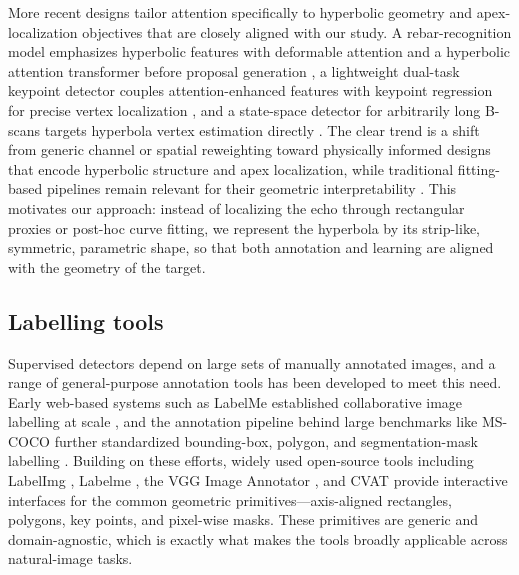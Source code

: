 \documentclass[lettersize,journal]{IEEEtran}
\begin{document}
More recent designs tailor attention specifically to hyperbolic geometry and apex-localization objectives that are closely aligned with our study. A rebar-recognition model emphasizes hyperbolic features with deformable attention and a hyperbolic attention transformer before proposal generation \cite{li2025rebar}, a lightweight dual-task keypoint detector couples attention-enhanced features with keypoint regression for precise vertex localization \cite{hou2025endtoend}, and a state-space detector for arbitrarily long B-scans targets hyperbola vertex estimation directly \cite{lan2024statespace}. The clear trend is a shift from generic channel or spatial reweighting toward physically informed designs that encode hyperbolic structure and apex localization, while traditional fitting-based pipelines remain relevant for their geometric interpretability \cite{lei2019autohyperbola}. This motivates our approach: instead of localizing the echo through rectangular proxies or post-hoc curve fitting, we represent the hyperbola by its strip-like, symmetric, parametric shape, so that both annotation and learning are aligned with the geometry of the target.


\subsection{Labelling tools}
Supervised detectors depend on large sets of manually annotated images, and a range of general-purpose annotation tools has been developed to meet this need. Early web-based systems such as LabelMe established collaborative image labelling at scale \cite{russell2008labelme}, and the annotation pipeline behind large benchmarks like MS-COCO further standardized bounding-box, polygon, and segmentation-mask labelling \cite{lin2014coco}. Building on these efforts, widely used open-source tools including LabelImg \cite{tzutalin2015labelimg}, Labelme \cite{wada2016labelme}, the VGG Image Annotator \cite{dutta2019via}, and CVAT \cite{cvat} provide interactive interfaces for the common geometric primitives---axis-aligned rectangles, polygons, key points, and pixel-wise masks. These primitives are generic and domain-agnostic, which is exactly what makes the tools broadly applicable across natural-image tasks.
\end{document}
